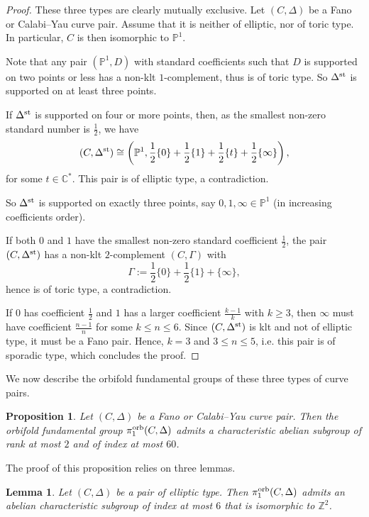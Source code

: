 \documentclass{amsart}
\newcommand{\pp}{\mathbb{P}}
\newcommand{\cc}{\mathbb{C}}
\newtheorem{lemma}[theorem]{Lemma}
\newtheorem{proposition}[theorem]{Proposition}
\theoremstyle{definition}
\theoremstyle{remark}
\numberwithin{equation}{section}
\begin{document}
\begin{proof}
    These three types are clearly mutually exclusive. Let $(C,\Delta)$ be a Fano or Calabi--Yau curve pair. Assume that it is neither of elliptic, nor of toric type. In particular, $C$ is then isomorphic to $\pp^1$. 

    Note that any pair $(\pp^1,D)$ with standard coefficients such that $D$ is supported on two points or less has a non-klt $1$-complement, thus is of toric type. So $\Delta^{\rm st}$ is supported on at least three points.

    If $\Delta^{\rm st}$ is supported on four or more points, then, as the smallest non-zero standard number is $\frac{1}{2}$, we have 
    $$(C,\Delta^{\rm st})\cong\left(\pp^1,\frac{1}{2}\{0\}+\frac{1}{2}\{1\}+\frac{1}{2}\{t\}+\frac{1}{2}\{\infty\}\right),$$
    for some $t\in\cc^*$. This pair is of elliptic type, a contradiction.

    So $\Delta^{\rm st}$ is supported on exactly three points, say $0,1,\infty\in\pp^1$ (in increasing coefficients order). 
    
    If both $0$ and $1$ have the smallest non-zero standard coefficient $\frac{1}{2}$, the pair $(C,\Delta^{\rm st})$ has a non-klt $2$-complement $(C,\Gamma)$ with
    $$\Gamma := \frac{1}{2}\{0\}+\frac{1}{2}\{1\}+\{\infty\},$$ hence is of toric type, a contradiction.

    If $0$ has coefficient $\frac{1}{2}$ and $1$ has a larger coefficient $\frac{k-1}{k}$ with $k\ge 3$, then $\infty$ must have coefficient $\frac{n-1}{n}$ for some $k\le n\le 6$. Since $(C,\Delta^{\rm st})$ is klt and not of elliptic type, it must be a Fano pair. Hence, $k=3$ and $3\le n\le 5$, i.e. this pair is of sporadic type, which concludes the proof.
\end{proof}

We now describe the orbifold fundamental groups of these three types of curve pairs.

\begin{proposition}\label{prop:curvepair}
    Let $(C,\Delta)$ be a Fano or Calabi--Yau curve pair. Then the orbifold fundamental group $\pi_1^{\rm orb}(C,\Delta)$ admits a characteristic abelian subgroup of rank at most $2$ and of index at most $60$.
\end{proposition}

The proof of this proposition relies on three lemmas.

\begin{lemma}\label{lem:ellpair}
    Let $(C,\Delta)$ be a pair of elliptic type. Then $\pi_1^{\rm orb}(C,\Delta)$ admits an abelian characteristic subgroup of index at most $6$ that is isomorphic to $\mathbb{Z}^2$.
\end{lemma}
\end{document}
